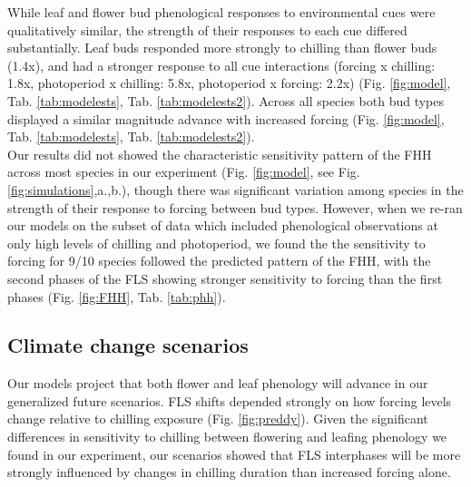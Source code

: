 \documentclass[11pt]{article}\usepackage[]{graphicx}\usepackage[]{color}
\begin{document}
\noindent While leaf and flower bud phenological responses to environmental cues were qualitatively similar, the strength of their responses to each cue differed substantially. Leaf buds responded more strongly to chilling than flower buds (1.4x), and had a stronger response to all cue interactions (forcing x chilling: 1.8x, photoperiod x chilling: 5.8x, photoperiod x forcing: 2.2x) (Fig. \ref{fig:model}, Tab. \ref{tab:modelests}, Tab. \ref{tab:modelests2}). Across all species both bud types displayed a similar magnitude advance with increased forcing (Fig. \ref{fig:model}, Tab. \ref{tab:modelests}, Tab. \ref{tab:modelests2}).\\

\noindent  Our results did not showed the characteristic sensitivity pattern of the FHH across most species in our experiment (Fig. \ref{fig:model}, see Fig. \ref{fig:simulations},a.,b.), though there was significant variation among species in the strength of their response to forcing between bud types. However, when we re-ran our models on the subset of data which included phenological observations at only high levels of chilling and photoperiod, we found the the sensitivity to forcing for 9/10 species followed the predicted pattern of the FHH, with the second phases of the FLS showing stronger sensitivity to forcing than the first phases (Fig. \ref{fig:FHH}, Tab. \ref{tab:phh}).\\ 

\subsection*{Climate change scenarios}
\noindent Our models project that both flower and leaf phenology will advance in our generalized future scenarios. FLS shifts depended strongly on how forcing levels change relative to chilling exposure (Fig. \ref{fig:preddy}). Given the significant differences in sensitivity to chilling between flowering and leafing phenology we found in our experiment, our scenarios showed that FLS interphases will be more strongly influenced by changes in chilling duration than increased forcing alone.\\ 
\end{document}

